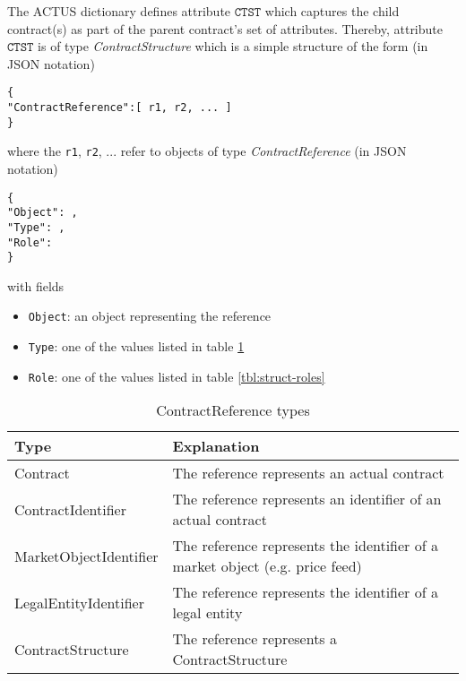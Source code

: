 \documentclass[9pt,oneside]{amsart}
\newcommand{\attr}[1]{\texttt{#1}}
\begin{document}
\begin{multicols}{2}
The ACTUS dictionary defines attribute $\attr{CTST}$ which captures the child contract(s) as part of the parent contract's set of attributes. Thereby, attribute $\attr{CTST}$ is of type \textit{ContractStructure} which is a simple structure of the form (in JSON notation)

\begin{verbatim}
{
"ContractReference":[ r1, r2, ... ]
}
\end{verbatim}

where the \verb'r1', \verb'r2', ... refer to objects of type \textit{ContractReference} (in JSON notation)

\begin{verbatim}
{
"Object": ,
"Type": ,
"Role":
}
\end{verbatim}

with fields

\begin{itemize}
	\item[] \verb'Object': an object representing the reference
	\item[] \verb'Type': one of the values listed in table \ref{tbl:struct-types}
	\item[] \verb'Role': one of the values listed in table \ref{tbl:struct-roles}
\end{itemize}


\begin{table}[H]
	\centering
	\begin{tabular}{| p{1.2in}p{1.7in} |}
	\hline
	\textbf{Type} & \textbf{Explanation} \\
	\hline
	Contract & The reference represents an actual contract \\
	\hline
	ContractIdentifier & The reference represents an identifier of an actual contract \\
	\hline
	MarketObjectIdentifier & The reference represents the identifier of a market object (e.g. price feed) \\
	\hline
	LegalEntityIdentifier & The reference represents the identifier of a legal entity \\
	\hline
	ContractStructure & The reference represents a ContractStructure \\
	\hline
	\end{tabular}
	\caption{ContractReference types}
	\label{tbl:struct-types}
\end{table}



\end{multicols}
\end{document}
